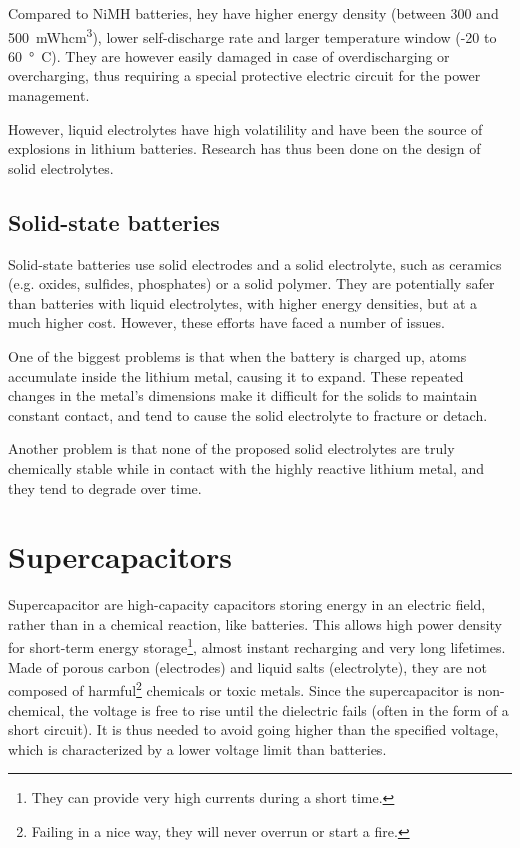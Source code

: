 \documentclass{EPL-master-thesis-covers-EN}
\begin{document}
Compared to NiMH batteries, hey have higher energy density (between 300 and \SI{500}{mWhcm^3}), lower self-discharge rate and larger temperature window (-20 to \SI{60}{\degree C}). They are however easily damaged in case of overdischarging or overcharging, thus requiring a special protective electric circuit for the power management.

However, liquid electrolytes have high volatilility and have been the source of explosions in lithium batteries. Research has thus been done on the design of solid electrolytes.

\subsection*{Solid-state batteries}

Solid-state batteries use solid electrodes and a solid electrolyte, such as ceramics (e.g. oxides, sulfides, phosphates) or a solid polymer. They are potentially safer than batteries with liquid electrolytes, with higher energy densities, but at a much higher cost.
However, these efforts have faced a number of issues.

One of the biggest problems is that when the battery is charged up, atoms accumulate inside the lithium metal, causing it to expand. These repeated changes in the metal’s dimensions make it difficult for the solids to maintain constant contact, and tend to cause the solid electrolyte to fracture or detach.

Another problem is that none of the proposed solid electrolytes are truly chemically stable while in contact with the highly reactive lithium metal, and they tend to degrade over time.

\section{Supercapacitors}

Supercapacitor are high-capacity capacitors storing energy in an electric field, rather than in a chemical reaction, like batteries. This allows high power density for short-term energy storage\footnote{They can provide very high currents during a short time.}, almost instant recharging and very long lifetimes. Made of porous carbon (electrodes) and liquid salts (electrolyte), they are not composed of harmful\footnote{Failing in a nice way, they will never overrun or start a fire.} chemicals or toxic metals.
Since the supercapacitor is non-chemical, the voltage is free to rise until the dielectric fails (often in the form of a short circuit). It is thus needed to avoid going higher than the specified voltage, which is characterized by a lower voltage limit than batteries.
\end{document}
